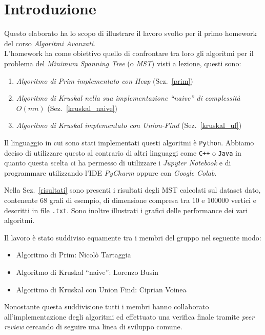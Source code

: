 \section{Introduzione}

Questo elaborato ha lo scopo di illustrare il lavoro svolto per il primo homework del corso \textit{Algoritmi Avanzati}.\\
L'homework ha come obiettivo quello di confrontare tra loro gli algoritmi per il problema del \textit{Minimum Spanning Tree} (o \textit{MST}) visti a lezione, questi sono:
\begin{enumerate}
	\item \textit{Algoritmo di Prim implementato con Heap} (Sez.~\ref{prim})
	\item \textit{Algoritmo di Kruskal nella sua implementazione ``naive'' di complessità $O(mn)$} (Sez.~\ref{kruskal_naive})
	\item \textit{Algoritmo di Kruskal implementato con Union-Find} (Sez.~\ref{kruskal_uf})
\end{enumerate}

Il linguaggio in cui sono stati implementati questi algoritmi è \texttt{Python}.
Abbiamo deciso di utilizzare questo al contrario di altri linguaggi come \texttt{C++} o \texttt{Java} in quanto questa scelta ci ha permesso di utilizzare i \textit{Jupyter Notebook} e di programmare utilizzando l'IDE \textit{PyCharm} oppure con \textit{Google Colab}.

Nella Sez.~\ref{risultati} sono presenti i risultati degli MST calcolati sul dataset dato, contenente 68 grafi di esempio, di dimensione compresa tra $10$ e $100000$ vertici e descritti in file \texttt{.txt}.
Sono inoltre illustrati i grafici delle performance dei vari algoritmi.

Il lavoro è stato suddiviso equamente tra i membri del gruppo nel seguente modo:
\begin{itemize}
	\item Algoritmo di Prim: Nicolò Tartaggia
	\item Algoritmo di Kruskal ``naive'': Lorenzo Busin
	\item Algoritmo di Kruskal con Union Find: Ciprian Voinea
\end{itemize}

Nonostante questa suddivisione tutti i membri hanno collaborato all'implementazione degli algoritmi ed effettuato una verifica finale tramite \textit{peer review} cercando di seguire una linea di sviluppo comune.

\pagebreak
